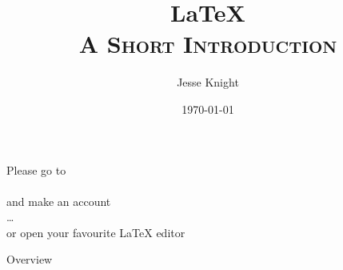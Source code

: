 \documentclass[11pt,aspectratio=169]{beamer}
\title[\LaTeX: A Short Introduction]{\LaTeX\\\textsc{\small{A Short Introduction}}}
\author[\href{\github}{\tiny\texttt{\github}}\hspace{0.2\linewidth}Jesse Knight]{Jesse Knight}
\institute{University of Toronto\\Libraries}
\date{\today}
\begin{document}
\begin{frame}
  \centering\Large
  Please go to
  \\
  \\
  and make an account
  \\\dots\\
  or open your favourite \LaTeX{} editor
\end{frame}
\begin{frame}
  \maketitle
\end{frame}
\begin{frame}[label=overview]{Overview}
  \tableofcontents
\end{frame}
\end{document}
